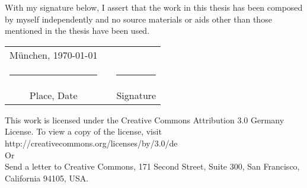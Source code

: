 \thispagestyle{plain}
\vspace*{1cm}
With my signature below, I assert that the work in this thesis has been composed by myself independently and no source materials or aids other than those mentioned in the thesis have been used.

\vspace{2cm}

\hspace{1cm}
\begin{tabular}{ccc}
  \vspace{-0.3cm}M\"unchen, \today 	&\hspace{4cm} 		& \\
  \rule{4.5cm}{0.4pt}					&					&\rule{4.5cm}{0.4pt}\\
  Place, Date							&					& Signature			
\end{tabular}           		

\vspace{4cm}
This work is licensed under the Creative Commons Attribution 3.0 Germany License. To view a copy of the license, visit http://creativecommons.org/licenses/by/3.0/de\\

Or\\

Send a letter to Creative Commons, 171 Second Street, Suite 300, San Francisco, California 94105, USA.
